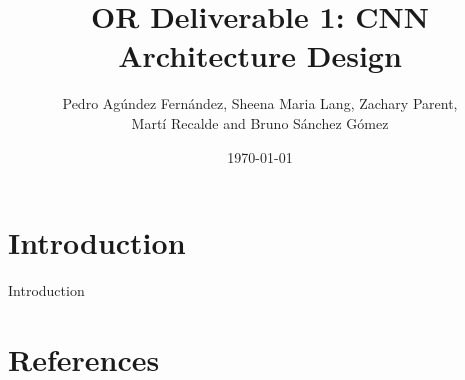 \documentclass[a4paper, 11pt]{article}
\title{OR Deliverable 1: CNN Architecture Design}
\author{Pedro Agúndez Fernández, Sheena Maria Lang, Zachary Parent, \\ Martí Recalde and Bruno Sánchez Gómez}
\date{\today}
\begin{document}
\maketitle

\section{Introduction}
Introduction

\section{References}
%
%
\end{document}
